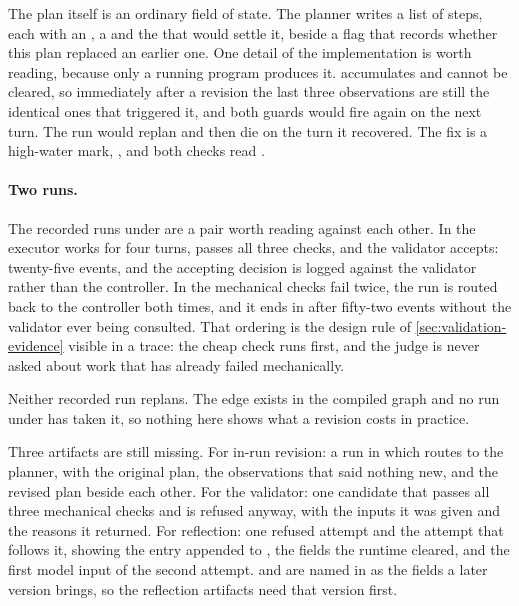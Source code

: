 \ei

The plan itself is an ordinary field of state. The planner writes a list of steps, each with an
, a  and the  that would settle it, beside a
 flag that records whether this plan replaced an earlier one. One detail of the
implementation is worth reading, because only a running program produces it. 
accumulates and cannot be cleared, so immediately after a revision the last three observations are
still the identical ones that triggered it, and both guards would fire again on the next turn. The
run would replan and then die on the turn it recovered. The fix is a high-water mark,
, and both checks read .

\paragraph{Two runs.} The recorded runs under  are a pair worth reading against
each other. In  the executor works for four turns,  passes all
three checks, and the validator accepts: twenty-five events, and the accepting decision is logged
against the validator rather than the controller. In  the mechanical checks
fail twice, the run is routed back to the controller both times, and it ends in 
after fifty-two events without the validator ever being consulted. That ordering is the design rule
of \cref{sec:validation-evidence} visible in a trace: the cheap check runs first, and the judge is
never asked about work that has already failed mechanically.

Neither recorded run replans. The edge exists in the compiled graph and no run under
 has taken it, so nothing here shows what a revision costs in practice.

\begin{demostub}
Three artifacts are still missing. For in-run revision: a run in which  routes
to the planner, with the original plan, the observations that said nothing new, and the revised plan
beside each other. For the validator: one candidate that passes all three mechanical checks and is
refused anyway, with the inputs it was given and the reasons it returned. For reflection: one
refused attempt and the attempt that follows it, showing the entry appended to
, the fields the runtime cleared, and the first model input of the second
attempt.  and  are named in  as the fields a
later version brings, so the reflection artifacts need that version first.
\end{demostub}

